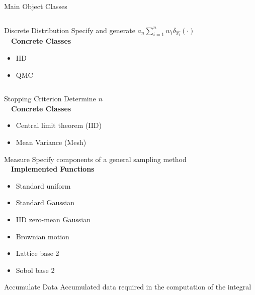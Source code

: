\documentclass[final]{beamer}
\newlength{\onecolwid}
\newlength{\twocolwid}
\newlength{\threecolwid}
\begin{document}
\begin{frame}[t]
\begin{columns}[t]
\begin{column}{\threecolwid}
\begin{columns}[t,totalwidth=\threecolwid]
\begin{column}{\twocolwid}
\begin{block}{Main Object Classes}
\begin{column}{\onecolwid}
\begin{alertblock}{Discrete Distribution}
    Specify and generate $a_n \sum_{i=1}^n w_i \delta_{\hat{x_i}}(\cdot)$ \\[1ex]~\
    \textbf{Concrete Classes}
    \begin{itemize}
        \item IID
        \item QMC
    \end{itemize}
\end{alertblock}
\end{column} 
\begin{column}{\onecolwid}
\begin{alertblock}{Stopping Criterion}
    Determine $n$ \\[1ex]~\
    \textbf{Concrete Classes}
    \begin{itemize}
        \item Central limit theorem (IID)
        \item Mean Variance (Mesh)
    \end{itemize}
\end{alertblock}

\begin{alertblock}{Measure}
    Specify components of a general sampling method \\[1ex]~\
    \textbf{Implemented Functions}
    \begin{itemize}
        \item Standard uniform
        \item Standard Gaussian
        \item IID zero-mean Gaussian
        \item Brownian motion 
        \item Lattice base 2 \cite{kuo2016application}
        \item Sobol base 2 \cite{kuo2016application}
    \end{itemize}
\end{alertblock}

\begin{alertblock}{Accumulate Data}
    Accumulated data required in the computation of the integral
\end{alertblock}
\end{column}


\end{block}
\end{column}
\end{columns}
\end{column}
\end{columns}
\end{frame}
\end{document}
